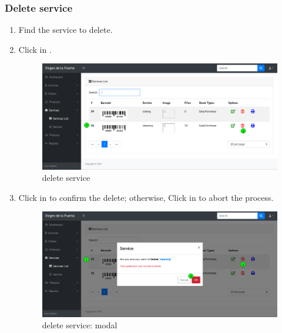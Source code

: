 \documentclass[a4paper,11pt]{refart}
\begin{document}
\subsubsection{Delete service}
\begin{enumerate}
	\item Find the service to delete.
	\item Click in .
	\begin{figure}[H]\centering
		\includegraphics[width=\textwidth]{images/service_list-delete.png}
		\caption{delete service}
		\label{fig:service_list-delete.png}
	\end{figure}
	\item Click in  to confirm the delete; otherwise, Click in  to abort the process.
	\begin{figure}[H]\centering
		\includegraphics[width=\textwidth]{images/service_list-delete-modal.png}
		\caption{delete service: modal}
		\label{fig:service_list-delete-modal.png}
	\end{figure}
\end{enumerate}
\end{document}
